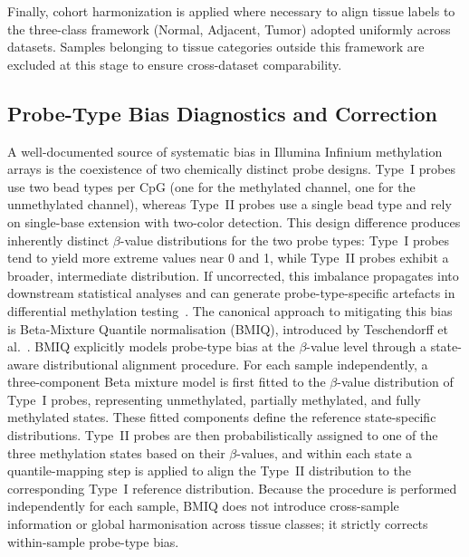 Finally, cohort harmonization is applied where necessary to align tissue 
labels to the three-class framework (Normal, Adjacent, Tumor) adopted 
uniformly across datasets. Samples belonging to tissue categories outside 
this framework are excluded at this stage to ensure cross-dataset 
comparability.

\subsection{Probe-Type Bias Diagnostics and Correction}
\label{subsec:step1}

A well-documented source of systematic bias in Illumina Infinium 
methylation arrays is the coexistence of two chemically distinct probe 
designs. Type~I probes use two bead types per CpG (one for the methylated 
channel, one for the unmethylated channel), whereas Type~II probes use a 
single bead type and rely on single-base extension with two-color 
detection. This design difference produces inherently distinct 
$\beta$-value distributions for the two probe types: Type~I probes tend 
to yield more extreme values near 0 and 1, while Type~II probes exhibit 
a broader, intermediate distribution. If uncorrected, this imbalance 
propagates into downstream statistical analyses and can generate 
probe-type-specific artefacts in differential methylation 
testing~\cite{Teschendorff2013BMIQ, maksimovic2012}.
The canonical approach to mitigating this bias is Beta-Mixture Quantile 
normalisation (BMIQ), introduced by Teschendorff et 
al.~\cite{Teschendorff2013BMIQ}. BMIQ explicitly models probe-type bias 
at the $\beta$-value level through a state-aware distributional alignment 
procedure. For each sample independently, a three-component Beta mixture model is 
first fitted to the $\beta$-value distribution of Type~I probes, 
representing unmethylated, partially methylated, and fully methylated 
states. These fitted components define the reference state-specific 
distributions. Type~II probes are then probabilistically assigned to one 
of the three methylation states based on their $\beta$-values, and within 
each state a quantile-mapping step is applied to align the Type~II 
distribution to the corresponding Type~I reference distribution. Because the procedure is performed independently for each sample, BMIQ 
does not introduce cross-sample information or global harmonisation across 
tissue classes; it strictly corrects within-sample probe-type bias.

